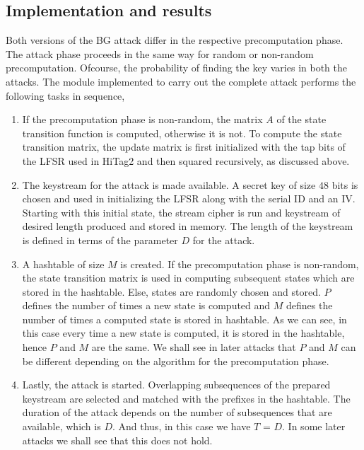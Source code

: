\subsection{Implementation and results}
\label{sec:keystream-attack-impl}

Both versions of the BG attack differ in the respective precomputation phase. The attack phase proceeds in the same way for random or non-random precomputation. Ofcourse, the probability of finding the key varies in both the attacks. The module implemented to carry out the complete attack performs the following tasks in sequence,
\begin{enumerate}
\item If the precomputation phase is non-random, the matrix $A$ of the state transition function is computed, otherwise it is not. To compute the state transition matrix, the update matrix is first initialized with the tap bits of the LFSR used in HiTag2 and then squared recursively, as discussed above.
\item The keystream for the attack is made available. A secret key of size $48$ bits is chosen and used in initializing the LFSR along with the serial ID and an IV. Starting with this initial state, the stream cipher is run and keystream of desired length produced and stored in memory. The length of the keystream is defined in terms of the parameter $D$ for the attack.
\item A hashtable of size $M$ is created. If the precomputation phase is non-random, the state transition matrix is used in computing subsequent states which are stored in the hashtable. Else, states are randomly chosen and stored. $P$ defines the number of times a new state is computed and $M$ defines the number of times a computed state is stored in hashtable. As we can see, in this case every time a new state is computed, it is stored in the hashtable, hence $P$ and $M$ are the same. We shall see in later attacks that $P$ and $M$ can be different depending on the algorithm for the precomputation phase. 
\item Lastly, the attack is started. Overlapping subsequences of the prepared keystream are selected and matched with the prefixes in the hashtable. The duration of the attack depends on the number of subsequences that are available, which is $D$. And thus, in this case we have $T$ = $D$. In some later attacks we shall see that this does not hold. 
\end{enumerate}


